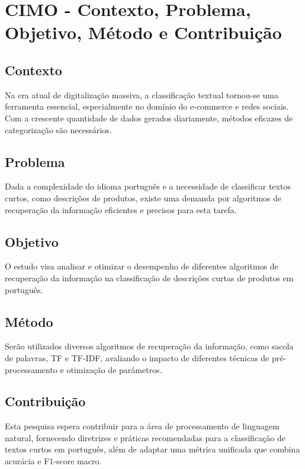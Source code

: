 
\section{CIMO - Contexto, Problema, Objetivo, Método e Contribuição}

\subsection{Contexto}
Na era atual de digitalização massiva, a classificação textual tornou-se uma ferramenta essencial, especialmente no domínio do e-commerce e redes sociais. Com a crescente quantidade de dados gerados diariamente, métodos eficazes de categorização são necessários.

\subsection{Problema}
Dada a complexidade do idioma português e a necessidade de classificar textos curtos, como descrições de produtos, existe uma demanda por algoritmos de recuperação da informação eficientes e precisos para esta tarefa.

\subsection{Objetivo}
O estudo visa analisar e otimizar o desempenho de diferentes algoritmos de recuperação da informação na classificação de descrições curtas de produtos em português.

\subsection{Método}
Serão utilizados diversos algoritmos de recuperação da informação, como sacola de palavras, TF e TF-IDF, avaliando o impacto de diferentes técnicas de pré-processamento e otimização de parâmetros.

\subsection{Contribuição}
Esta pesquisa espera contribuir para a área de processamento de linguagem natural, fornecendo diretrizes e práticas recomendadas para a classificação de textos curtos em português, além de adaptar uma métrica unificada que combina acurácia e F1-score macro.
